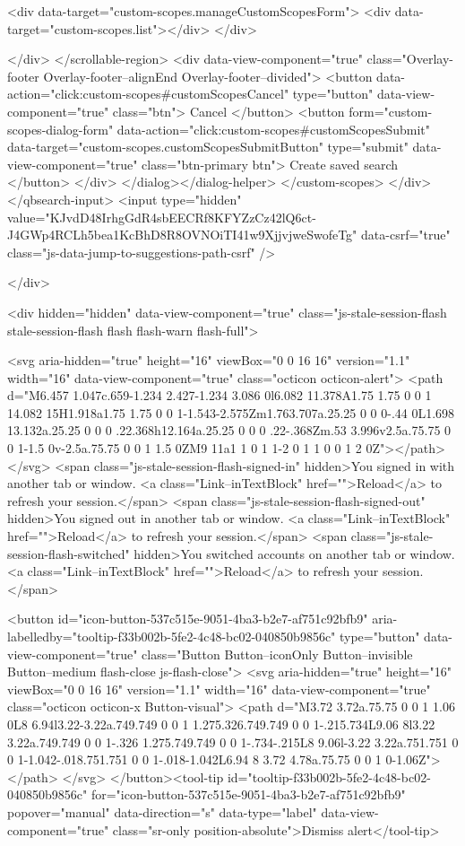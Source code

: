 {{        <div data-target="custom-scopes.manageCustomScopesForm">
          <div data-target="custom-scopes.list"></div>
        </div>

</div>
      </scrollable-region>
      <div data-view-component="true" class="Overlay-footer Overlay-footer--alignEnd Overlay-footer--divided">          <button data-action="click:custom-scopes#customScopesCancel" type="button" data-view-component="true" class="btn">    Cancel
</button>
          <button form="custom-scopes-dialog-form" data-action="click:custom-scopes#customScopesSubmit" data-target="custom-scopes.customScopesSubmitButton" type="submit" data-view-component="true" class="btn-primary btn">    Create saved search
</button>
</div>
</dialog></dialog-helper>
    </custom-scopes>
  </div>
</qbsearch-input>  <input type="hidden" value="KJvdD48IrhgGdR4sbEECRf8KFYZzCz42lQ6ct-J4GWp4RCLh5bea1KcBhD8R8OVNOiTI41w9XjjvjweSwofeTg" data-csrf="true" class="js-data-jump-to-suggestions-path-csrf" />


      </div>


      <div hidden="hidden" data-view-component="true" class="js-stale-session-flash stale-session-flash flash flash-warn flash-full">
  
        <svg aria-hidden="true" height="16" viewBox="0 0 16 16" version="1.1" width="16" data-view-component="true" class="octicon octicon-alert">
    <path d="M6.457 1.047c.659-1.234 2.427-1.234 3.086 0l6.082 11.378A1.75 1.75 0 0 1 14.082 15H1.918a1.75 1.75 0 0 1-1.543-2.575Zm1.763.707a.25.25 0 0 0-.44 0L1.698 13.132a.25.25 0 0 0 .22.368h12.164a.25.25 0 0 0 .22-.368Zm.53 3.996v2.5a.75.75 0 0 1-1.5 0v-2.5a.75.75 0 0 1 1.5 0ZM9 11a1 1 0 1 1-2 0 1 1 0 0 1 2 0Z"></path>
</svg>
        <span class="js-stale-session-flash-signed-in" hidden>You signed in with another tab or window. <a class="Link--inTextBlock" href="">Reload</a> to refresh your session.</span>
        <span class="js-stale-session-flash-signed-out" hidden>You signed out in another tab or window. <a class="Link--inTextBlock" href="">Reload</a> to refresh your session.</span>
        <span class="js-stale-session-flash-switched" hidden>You switched accounts on another tab or window. <a class="Link--inTextBlock" href="">Reload</a> to refresh your session.</span>

    <button id="icon-button-537c515e-9051-4ba3-b2e7-af751c92bfb9" aria-labelledby="tooltip-f33b002b-5fe2-4c48-bc02-040850b9856c" type="button" data-view-component="true" class="Button Button--iconOnly Button--invisible Button--medium flash-close js-flash-close">  <svg aria-hidden="true" height="16" viewBox="0 0 16 16" version="1.1" width="16" data-view-component="true" class="octicon octicon-x Button-visual">
    <path d="M3.72 3.72a.75.75 0 0 1 1.06 0L8 6.94l3.22-3.22a.749.749 0 0 1 1.275.326.749.749 0 0 1-.215.734L9.06 8l3.22 3.22a.749.749 0 0 1-.326 1.275.749.749 0 0 1-.734-.215L8 9.06l-3.22 3.22a.751.751 0 0 1-1.042-.018.751.751 0 0 1-.018-1.042L6.94 8 3.72 4.78a.75.75 0 0 1 0-1.06Z"></path>
</svg>
</button><tool-tip id="tooltip-f33b002b-5fe2-4c48-bc02-040850b9856c" for="icon-button-537c515e-9051-4ba3-b2e7-af751c92bfb9" popover="manual" data-direction="s" data-type="label" data-view-component="true" class="sr-only position-absolute">Dismiss alert</tool-tip>


}}
